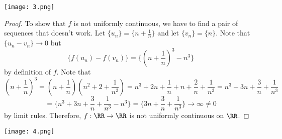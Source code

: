 \documentclass[12pt]{scrartcl}
\begin{document}
\texttt{[image: 3.png]}

\begin{proof}

To show that $f$ is not uniformly continuous, we have to find a pair of sequences
that doesn't work. Let $\{u_n\} = \{n + \frac{1}{n}\}$ and let $\{v_n\} = \{n\}$. Note 
that $\{u_n - v_n\} \to 0 $ but 
\[\{f(u_n) - f(v_n)\} = \{(n + \frac{1}{n})^3 - n^3\}\]
by definition of $f$. Note that 
\[(n + \frac{1}{n})^3 = (n + \frac{1}{n})(n^2 + 2 + \frac{1}{n^2}) = n^3 + 2n + \frac{1}{n} + n + \frac{2}{n} + \frac{1}{n^3} = n^3 + 3n + \frac{3}{n} + \frac{1}{n^3}\]
\[= \{n^3 + 3n + \frac{3}{n} + \frac{1}{n^3} - n^3\} = \{3n + \frac{3}{n} + \frac{1}{n^3}\} \to \infty \neq 0\]
by limit rules.
Therefore, $f: \RR \to \RR$ is not uniformly continuous on $\RR$. 

\end{proof}
\newpage

\texttt{[image: 4.png]}
\end{document}
